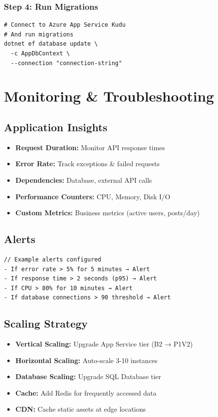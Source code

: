 \subsubsection{Step 4: Run Migrations}
\begin{verbatim}
# Connect to Azure App Service Kudu
# And run migrations
dotnet ef database update \
  -c AppDbContext \
  --connection "connection-string"
\end{verbatim}

\section{Monitoring \& Troubleshooting}

\subsection{Application Insights}

\begin{itemize}
    \item \textbf{Request Duration:} Monitor API response times
    \item \textbf{Error Rate:} Track exceptions \& failed requests
    \item \textbf{Dependencies:} Database, external API calls
    \item \textbf{Performance Counters:} CPU, Memory, Disk I/O
    \item \textbf{Custom Metrics:} Business metrics (active users, posts/day)
\end{itemize}

\subsection{Alerts}

\begin{verbatim}
// Example alerts configured
- If error rate > 5% for 5 minutes → Alert
- If response time > 2 seconds (p95) → Alert
- If CPU > 80% for 10 minutes → Alert
- If database connections > 90 threshold → Alert
\end{verbatim}

\subsection{Scaling Strategy}

\begin{itemize}
    \item \textbf{Vertical Scaling:} Upgrade App Service tier (B2 → P1V2)
    \item \textbf{Horizontal Scaling:} Auto-scale 3-10 instances
    \item \textbf{Database Scaling:} Upgrade SQL Database tier
    \item \textbf{Cache:} Add Redis for frequently accessed data
    \item \textbf{CDN:} Cache static assets at edge locations
\end{itemize}
